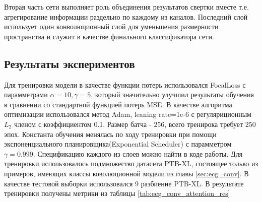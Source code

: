 \documentclass[oneside,final,14pt]{extreport}
\begin{document}
Вторая часть сети выполняет роль объединения результатов свертки вместе т.е. агрегирование информации раздельно по каждому из каналов. Последний слой использует один конволюционный слой для уменьшения размерности пространства и служит в качестве финального классификатора сети.


\subsection{Результаты экспериментов}
Для тренировки модели в качестве функции потерь использовался FocalLoss\cite{bib:focal_loss} с парамметрами $\alpha=10, \gamma=5$, который значительно улучшил результаты обучения в сравнении со стандартной функцией потерь MSE.  В качестве алгоритма оптимизации использовался метод Adam\cite{bib:torch}, leaning rate=1e-6 с регуляриционным $L_2$ членом с коэффициентом 0.1. Размер батча - $256$, всего тренирока требует $250$ эпох.  Константа обучения менялась по ходу тренировки при помощи экспоненциального планировщика(Exponential Scheduler)\cite{bib:torch} с парамметром $\gamma=0.999$.  Спецификацию каждого из слоев можно найти в коде работы. Для тренировки использовалось подмножество датасета PTB-XL, состоящее только из примеров, имеющих классы коволюционной модели из главы \ref{sec:ecg_conv}. В качестве тестовой выборки использовался 9 разбиение PTB-XL.  В результате тренировки получены метрики из таблицы \ref{tab:ecg_conv_attention_res}
\end{document}

